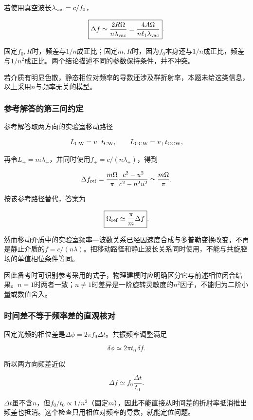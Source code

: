 \documentclass[12pt,a4paper,fontset=fandol]{ctexart}
\begin{document}
若使用真空波长\(\lambda_{\rm vac}=c/f_0\)，

\[
\boxed{
\Delta f\simeq
\frac{2R\Omega}{n\lambda_{\rm vac}}
=\frac{4A\Omega}{n\ell_1\lambda_{\rm vac}}}.
\]

固定\(f_0,R\)时，频差与\(1/n\)成正比；固定\(m,R\)时，因为\(f_0\)本身还与\(1/n\)成正比，频差与\(1/n^2\)成正比。两个结论描述不同的参数保持条件，并不冲突。

若介质有明显色散，静态相位对频率的导数还涉及群折射率，本题未给这类信息，以上采用\(n\)与频率无关的模型。

\par\noindent\begin{minipage}{\linewidth}
\subsubsection{参考解答的第三问约定}\label{ux53c2ux8003ux89e3ux7b54ux7684ux7b2cux4e09ux95eeux7ea6ux5b9a}

参考解答取两方向的实验室移动路径

\[
L_{\rm CW}=v_-t_{\rm CW},\qquad
L_{\rm CCW}=v_+t_{\rm CCW},
\]

再令\(L_\pm=m\lambda_\pm\)，并同时使用\(f_\pm=c/(n\lambda_\pm)\)，得到

\[
\Delta f_{\rm ref}
=\frac{m\Omega}{\pi}
\frac{c^2-u^2}{c^2-n^2u^2}
\simeq\frac{m\Omega}{\pi}.
\]

按该参考路径替代，答案为

\[
\boxed{\Omega_{\rm ref}\simeq\frac\pi m\Delta f}.
\]

然而移动介质中的实验室频率---波数关系已经因速度合成与多普勒变换改变，不再是静止介质的\(f=c/(n\lambda)\)。把移动路径和静止波长关系同时使用，不能与共旋腔场的单值相位条件等同。

因此备考时可识别参考采用的式子，物理建模时应明确区分它与前述相位闭合结果。\(n=1\)时两者一致；\(n\neq1\)时差异是一阶旋转灵敏度的\(n^2\)因子，不能归为二阶小量或数值舍入。

\subsubsection{时间差不等于频率差的直观核对}\label{ux65f6ux95f4ux5deeux4e0dux7b49ux4e8eux9891ux7387ux5deeux7684ux76f4ux89c2ux6838ux5bf9}

固定光频的相位差是\(\Delta\phi=2\pi f_0\Delta t\)。共振频率调整满足

\[
\delta\phi\simeq2\pi t_0\,\delta f.
\]

所以两方向频差近似

\[
\Delta f\simeq f_0\frac{\Delta t}{t_0}.
\]

\(\Delta t\)虽不含\(n\)，但\(f_0/t_0\propto1/n^2\)（固定\(m\)），因此不能直接从时间差的折射率抵消推出频差也抵消。这个检查只用相位对频率的导数，就能定位问题。

\end{minipage}\par
\clearpage
\end{document}
